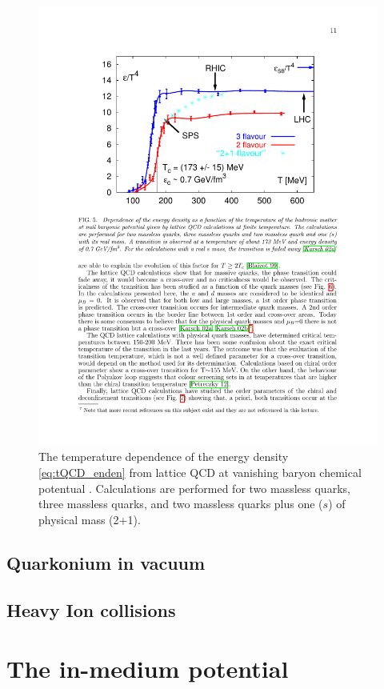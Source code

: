 \documentclass[11pt, a4paper, twoside]{book}
\begin{document}
\begin{figure}[t]
	\centering
	\includegraphics[width=\textwidth]{QCD_lat_enden}
	\caption{The temperature dependence of the energy density \eqref{eq:tQCD_enden} from lattice QCD at vanishing baryon chemical potentual \cite{Martinez:2013xka}. Calculations are performed for two massless quarks, three massless quarks, and two massless quarks plus one (\(s\)) of physical mass (2+1).}\label{fig:lattice_en_den}
\end{figure}
\section{Quarkonium in vacuum}
\label{sec:quark_vac}
\onehalfspacing
\section{Heavy Ion collisions}
\label{sec:quark_HIC}
\onehalfspacing
\chapter{The in-medium potential}
\label{sec:med_pot}
\onehalfspacing
\end{document}
